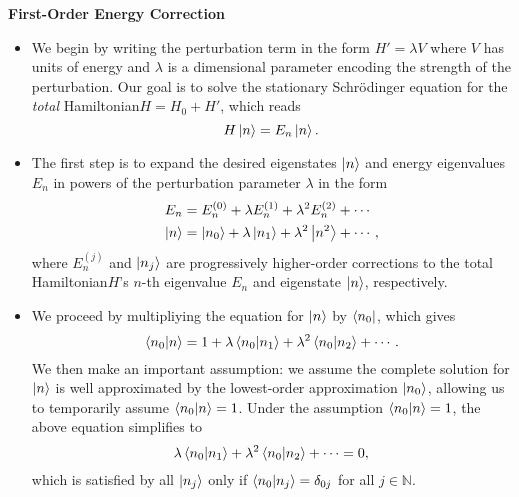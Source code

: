 \documentclass[11pt, a4paper]{article}
\newcommand{\Schro}{Schr\"{o}dinger\xspace}
\newcommand{\Ham}{Hamiltonian\xspace}
\begin{document}
\textbf{First-Order Energy Correction}
\begin{itemize}

    \item We begin by writing the perturbation term in the form $ H' = \lambda V $ where $ V $ has units of energy and $ \lambda $ is a dimensional parameter encoding the strength of the perturbation. Our goal is to solve the stationary \Schro equation for the \textit{total} \Ham $ H = H_{0} + H' $, which reads
    \begin{equation*}
        H \ket{n} = E_{n}\ket{n}.
    \end{equation*}
    

    \item The first step is to expand the desired eigenstates $ \ket{n} $ and energy eigenvalues $ E_{n} $ in powers of the perturbation parameter $ \lambda $ in the form
    \begin{align*}
        E_{n} &= E_{n}^{(0)} + \lambda E_{n}^{(1)} + \lambda^{2} E_{n}^{(2)} + \cdots\\
        \ket{n} &= \ket{n_{0}} + \lambda \ket{n_{1}} + \lambda^{2} \ket{n^{2}} + \cdots,
    \end{align*}
    where $ E_{n}^{(j)} $ and $ \ket{n_{j}} $ are progressively higher-order corrections to the total \Ham $ H $'s $ n $-th eigenvalue $ E_{n} $ and eigenstate $ \ket{n} $, respectively.

    \item We proceed by multipliying the equation for $ \ket{n} $ by $ \bra{n_{0}} $, which gives
    \begin{equation*}
        \braket{n_{0}}{n} = 1 + \lambda \braket{n_{0}}{n_{1}} + \lambda^{2}\braket{n_{0}}{n_{2}} + \cdots.
    \end{equation*}
    We then make an important assumption: we assume the complete solution for $ \ket{n} $ is well approximated by the lowest-order approximation $ \ket{n_{0}} $, allowing us to temporarily assume $ \braket{n_{0}}{n} = 1 $. Under the assumption $ \braket{n_{0}}{n} = 1 $, the above equation simplifies to
    \begin{equation*}
        \lambda \braket{n_{0}}{n_{1}} + \lambda^{2}\braket{n_{0}}{n_{2}} + \cdots = 0,
    \end{equation*}
    which is satisfied by all $ \ket{n_{j}} $ only if $ \braket{n_{0}}{n_{j}} = \delta_{0j} $ for all $ j \in \mathbb{N} $.


\end{itemize}
\end{document}
